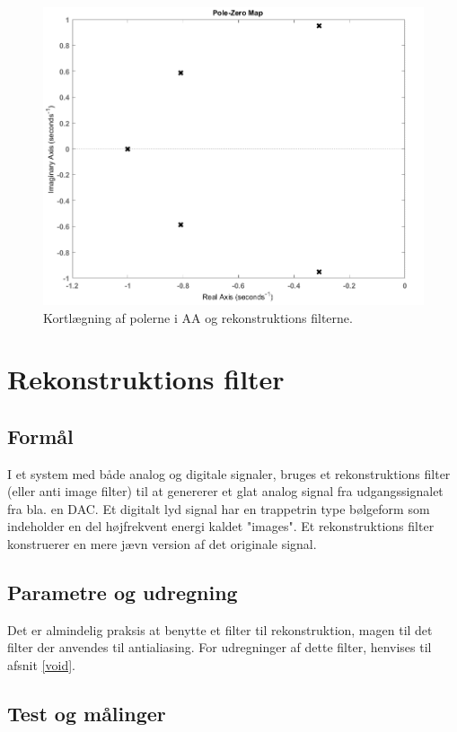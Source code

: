 \begin{figure}[h!]
	\centering
	\includegraphics[scale = 0.4]{./billeder/pzmap}
	\caption{Kortlægning af polerne i AA og rekonstruktions filterne.}
	\label{fig:afilter_pol}
\end{figure}
\FloatBlock
\section{Rekonstruktions filter}
\subsection{Formål}
I et system med både analog og digitale signaler, bruges et rekonstruktions filter (eller anti image filter) til at genererer et glat analog signal fra udgangssignalet fra bla. en DAC. Et digitalt lyd signal har en trappetrin type bølgeform som indeholder en del højfrekvent energi kaldet "images". Et rekonstruktions filter konstruerer en mere jævn version af det originale signal.
\subsection{Parametre og udregning}
Det er almindelig praksis at benytte et filter til rekonstruktion, magen til det filter der anvendes til antialiasing. For udregninger af dette filter, henvises til afsnit \ref{void}.
\subsection{Test og målinger}